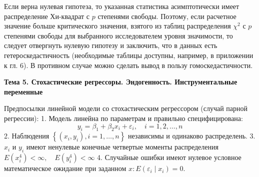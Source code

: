 \documentclass[a4paper,8pt]{article} %
\begin{document}
Если верна нулевая гипотеза, то указанная статистика асимптотически имеет распределение Хи-квадрат с $p$ степенями свободы. Поэтому, если расчетное значение больше критического значения, взятого из таблиц распределения $\chi^{2}$ с $p$ степенями свободы для выбранного исследователем уровня значимости, то следует отвергнуть нулевую гипотезу и заключить, что в данных есть гетероскедастичность (необходимые таблицы доступны, например, в приложении к гл. 6). В противном случае можно сделать вывод в пользу гомоскедастичности.


%
%
%
%
%
%
%



\newpage



\textbf{Тема 5. Стохастические регрессоры. Эндогенность. Инструментальные переменные}

Предпосылки линейной модели со стохастическим регрессором (случай парной регрессии):
1. Модель линейна по параметрам и правильно специфицирована:
$$
y_{i}=\beta_{1}+\beta_{2} x_{i}+\varepsilon_{i}, \quad i=1,2, \ldots, n
$$
2. Наблюдения $\left\{\left(x_{i}, y_{i}\right), i=1, \ldots, n\right\}$ независимы и одинаково распределень.
3. $x_{i}$ и $y_{i}$ имеют ненулевые конечные четвертые моменты распределения $E\left(x_{i}^{4}\right)<\infty, \quad E\left(y_{i}^{4}\right)<\infty$
4. Случайные ошибки имеют нулевое условное математическое ожидание при заданном $x: E\left(\varepsilon_{i} \mid x_{i}\right)=0 .$
\end{document}
